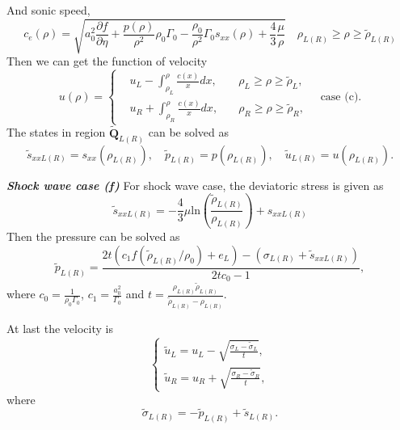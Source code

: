 \documentclass[review]{elsarticle}
\begin{document}
And sonic speed,
\begin{equation}
  c_e(\rho) = 
	  \sqrt{a_0^2 \frac{\partial f}{\partial \eta} + \frac{p(\rho)}{\rho^2}\rho_0\Gamma_0 -\frac{\rho_0}{\rho^2}\Gamma_0 s_{xx}(\rho) +\frac{4}{3}\frac{\mu}{\rho}} \quad   \rho_{L(R)} \ge \rho \ge \tilde{\rho}_{L(R)}
\end{equation}
Then we can get  the   function of  velocity
\begin{equation}
  u(\rho) =\left\{ \begin{aligned} 
	&u_L - \int_{\rho_L}^{\rho} \frac{c(x)}{x} dx, \quad & \rho_{L} \ge \rho \ge \tilde{\rho}_{L}
 , \\
 &u_R + \int_{\rho_R}^{\rho} \frac{c(x)}{x} dx, \quad &  \rho_R\ge \rho\ge \tilde{\rho}_R , 
	\end{aligned}
  \right. \quad \text{case (c)}.
\end{equation}
The states in region $\tilde{\mathbf{Q}}_{L(R)}$ can be solved as 
\begin{equation}
  \tilde{s}_{xxL(R)} = s_{xx}(\rho_{L(R)}),\quad \tilde{p}_{L(R)} = p(\rho_{L(R)}), \quad \tilde{u}_{L(R)} = u(\rho_{L(R)}).
\end{equation}

\emph{\textbf{Shock wave case (f)}} For shock wave case, the deviatoric stress is given as 
\begin{equation}
  \tilde{ s}_{xxL(R)} =
  -\frac{4}{3}\mu\text{ln}\left(\frac{\tilde{\rho}_{L(R)}}{\rho_{L(R)}}\right)+s_{xxL(R)}
	\end{equation}
	Then the pressure can be solved as 
\begin{equation}
  \tilde{p}_{L(R)}=
  \frac{2t(c_1f(\tilde{\rho}_{L(R)}/\rho_0)+e_L)-(\sigma_{L(R)}+\tilde{s}_{xxL(R)})}{2tc_0-1},
\end{equation}
where $c_0 = \frac{1}{\rho_0\Gamma_0}$, $c_1 = \frac{a_0^2}{\Gamma_0}$ and $ t=\frac{\rho_{L(R)} \tilde{\rho}_{L(R)}}{\tilde{\rho}_{L(R)}-\rho_{L(R)}}$.

At last the velocity is
\begin{equation}
 \left\{ \begin{array}{ll}
   \tilde{u}_{L}= u_L -\sqrt{\frac{\sigma_L-\tilde{\sigma}_{L}}{t}},\\ 
	   \tilde{u}_{R} =   u_R +\sqrt{\frac{\sigma_R-\tilde{\sigma}_{R}}{t}},  
   \end{array}
 \right.
 \end{equation}
 where 
 \begin{equation}
   \tilde{\sigma}_{L(R)} = -\tilde{p}_{L(R)} + \tilde{s}_{L(R)}.
 \end{equation}
\end{document}
